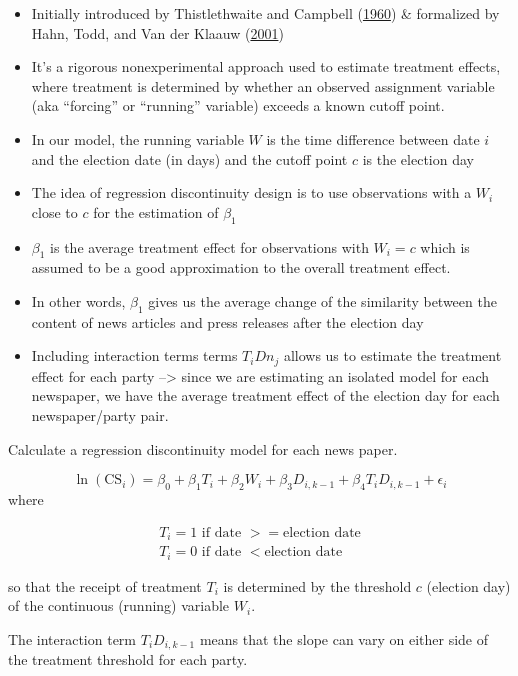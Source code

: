 \documentclass[
]{article}
\providecommand{\tightlist}{%
  \setlength{\itemsep}{0pt}\setlength{\parskip}{0pt}}
\begin{document}
\begin{itemize}
\tightlist
\item
  Initially introduced by Thistlethwaite and Campbell
  (\protect\hyperlink{ref-thistlethwaite_regression-discontinuity_1960}{1960})
  \& formalized by Hahn, Todd, and Van der Klaauw
  (\protect\hyperlink{ref-hahn_identification_2001}{2001})
\item
  It's a rigorous nonexperimental approach used to estimate treatment
  effects, where treatment is determined by whether an observed
  assignment variable (aka ``forcing'' or ``running'' variable) exceeds
  a known cutoff point.
\item
  In our model, the running variable \(W\) is the time difference
  between date \(i\) and the election date (in days) and the cutoff
  point \(c\) is the election day
\item
  The idea of regression discontinuity design is to use observations
  with a \(W_i\) close to \(c\) for the estimation of \(\beta_1\)
\item
  \(\beta_1\) is the average treatment effect for observations with
  \(W_i = c\) which is assumed to be a good approximation to the overall
  treatment effect.
\item
  In other words, \(\beta_1\) gives us the average change of the
  similarity between the content of news articles and press releases
  after the election day
\item
  Including interaction terms terms \(T_iDn_{j}\) allows us to estimate
  the treatment effect for each party --\textgreater{} since we are
  estimating an isolated model for each newspaper, we have the average
  treatment effect of the election day for each newspaper/party pair.
\end{itemize}

Calculate a regression discontinuity model for each news paper.

\[
\ln(\text{CS}_{i})=\beta_0+\beta_1T_i+\beta_2W_{i}+\beta_3D_{i,k-1}+\beta_4T_iD_{i,k-1}+\epsilon_i
\] where

\[\begin{aligned}
T_i = 1 \text{ if date } >= \text{election date} \\
T_i = 0 \text{ if date } < \text{election date}
\end{aligned}\]

so that the receipt of treatment \(T_i\) is determined by the threshold
\(c\) (election day) of the continuous (running) variable \(W_i\).

The interaction term \(T_iD_{i,k-1}\) means that the slope can vary on
either side of the treatment threshold for each party.
\end{document}
